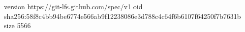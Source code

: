 version https://git-lfs.github.com/spec/v1
oid sha256:58f8c4bb94be6774e566ab9f12238086e3d788c4c64f6b6107f64250f7b7631b
size 5566
